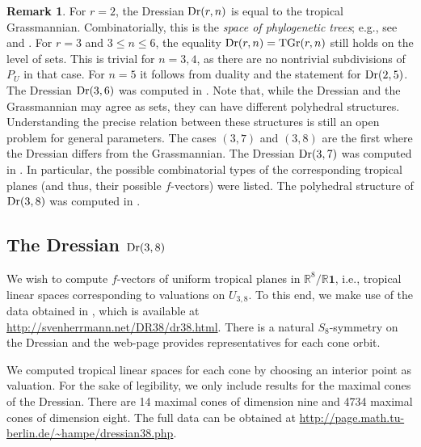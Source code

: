 \documentclass[11pt,a4paper]{amsart}
\theoremstyle{definition}
\newtheorem{remark}[definition]{Remark}
\theoremstyle{plain}
\begin{document}
\begin{remark}
  For $r = 2$, the Dressian ${\textnormal{Dr}}(r,n)$ is equal to the tropical Grassmannian.
  Combinatorially, this is the \emph{space of phylogenetic trees}; e.g., see \cite[\S1.3]{Kapranov93} and \cite[\S4.3]{Tropical+Book}. 
  For $r = 3$ and $3 \leq n \leq 6$, the equality ${\textnormal{Dr}}(r,n) = {\textnormal{TGr}} (r,n)$ still holds on the level of sets. This is trivial for $n = 3,4$, as there are no nontrivial subdivisions of $P_U$ in that case. For $n = 5$ it follows from duality and the statement for ${\textnormal{Dr}}(2,5)$. The Dressian ${\textnormal{Dr}}(3,6)$ was computed in \cite{SpeyerSturmfels:2004}. Note that, while the Dressian and the Grassmannian may agree as sets, they can have different polyhedral structures. Understanding the precise relation between these structures is still an open problem for general parameters.
  The cases $(3,7)$ and $(3,8)$ are the first where the Dressian differs from the Grassmannian. 
  The Dressian ${\textnormal{Dr}}(3,7)$ was computed in \cite{HerrmannJensenJoswigSturmfels:2009}. 
  In particular, the possible combinatorial types of the corresponding tropical planes (and thus, their possible $f$-vectors) were listed. 
  The polyhedral structure of ${\textnormal{Dr}}(3,8)$ was computed in \cite{HerrmannJoswigSpeyer:2012}.
\end{remark}

\subsection{The Dressian \texorpdfstring{${\textnormal{Dr}}(3,8)$}{Dr(3,8)}}

We wish to compute $f$-vectors of uniform tropical planes in ${\mathbb{R}}^8/{\mathbb{R}}{{\mathbf 1}}$, i.e., tropical linear spaces corresponding to valuations on $U_{3,8}$. To this end, we make use of the data obtained in \cite{HerrmannJoswigSpeyer:2012}, which is available at \url{http://svenherrmann.net/DR38/dr38.html}. There is a natural $S_8$-symmetry on the Dressian and the web-page provides representatives for each cone orbit. 

We computed tropical linear spaces for each cone by choosing an interior point as valuation. 
For the sake of legibility, we only include results for the maximal cones of the Dressian. There are 14 maximal cones of dimension nine and 4734 maximal cones of dimension eight. The full data can be obtained at \url{http://page.math.tu-berlin.de/~hampe/dressian38.php}.
\end{document}

